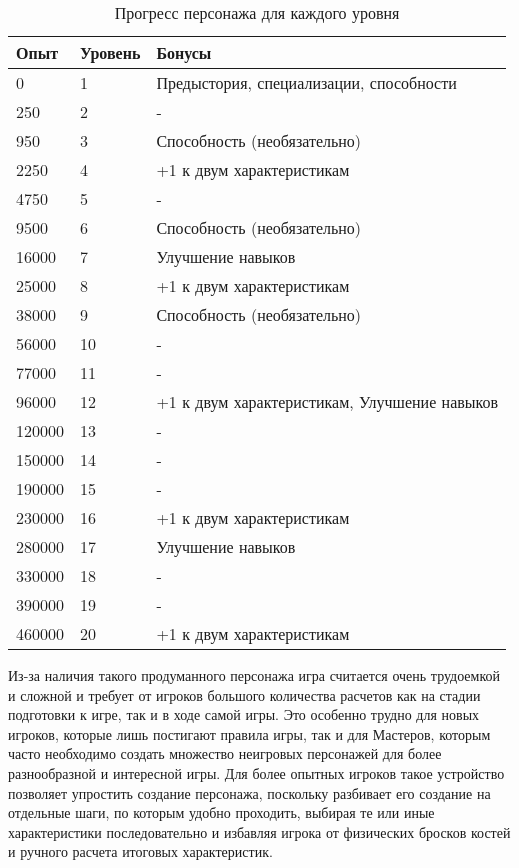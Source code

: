 \begin{table}[H]
    \centering
    \caption{Прогресс персонажа для каждого уровня}
    \begin{tabular}{|l|l|l|}
        \hline
        Опыт & Уровень & Бонусы \\
        \hline
        0 & 1 & Предыстория, специализации, способности \\
        \hline
        250 & 2 & - \\
        \hline
        950 & 3 & Способность (необязательно) \\
        \hline
        2250 & 4 & +1 к двум характеристикам \\
        \hline
        4750 & 5 & - \\
        \hline
        9500 & 6 & Способность (необязательно) \\
        \hline
        16000 & 7 & Улучшение навыков \\
        \hline
        25000 & 8 & +1 к двум характеристикам \\
        \hline
        38000 & 9 & Способность (необязательно) \\
        \hline
        56000 & 10 & - \\
        \hline
        77000 & 11 & - \\
        \hline
        96000 & 12 & +1 к двум характеристикам, Улучшение навыков \\
        \hline
        120000 & 13 & - \\
        \hline
        150000 & 14 & - \\
        \hline
        190000 & 15 & - \\
        \hline
        230000 & 16 & +1 к двум характеристикам \\
        \hline
        280000 & 17 & Улучшение навыков \\
        \hline
        330000 & 18 & - \\
        \hline
        390000 & 19 & - \\
        \hline
        460000 & 20 & +1 к двум характеристикам \\
        \hline
    \end{tabular}
    \label{tab:my_label}
\end{table}

Из-за наличия такого продуманного персонажа игра считается очень трудоемкой и сложной и требует от игроков большого количества расчетов как на стадии подготовки к игре, так и в ходе самой игры. Это особенно трудно для новых игроков, которые лишь постигают правила игры, так и для Мастеров, которым часто необходимо создать множество неигровых персонажей для более разнообразной и интересной игры. Для более опытных игроков такое устройство позволяет упростить создание персонажа, поскольку разбивает его создание на отдельные шаги, по которым удобно проходить, выбирая те или иные характеристики последовательно и избавляя игрока от физических бросков костей и ручного расчета итоговых характеристик.

